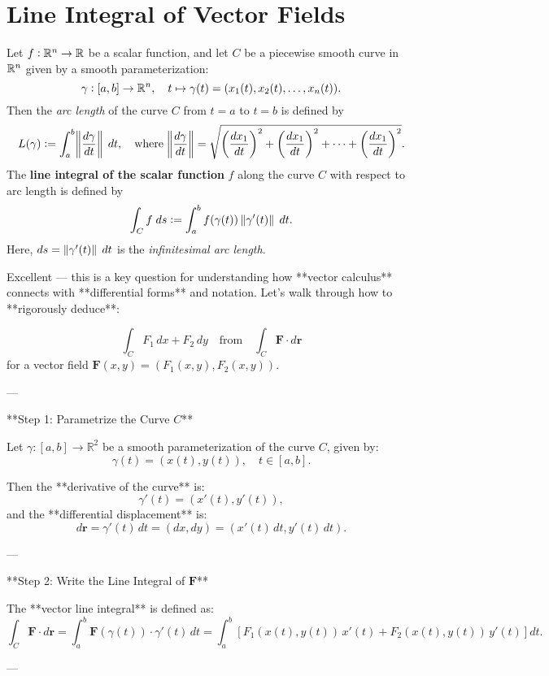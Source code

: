 \documentclass[11pt,openany]{article}
\renewcommand{\vec}[1]{\mathbf{#1}}
\begin{document}
\newpage
\section*{Line Integral of Vector Fields}
\begin{definition*}
	Let $f:\mathbb{R}^n\to\mathbb{R}$ be a scalar function, and let $C$ be a piecewise smooth curve in 
	$\mathbb{R}^n$ given by a smooth parameterization: \[
	\gamma:[a,b]\to\mathbb{R}^n,\quad t\mapsto \gamma(t)=(x_1(t),x_2(t),\dots,x_n(t)).
	\] Then the \emph{arc length} of the curve $C$ from $t=a$ to $t=b$ is defined by \[
	L(\gamma):=\int_a^b\norm{\frac{ d\gamma}{dt}}\; dt,\quad\text{where}\; \norm{\frac{d\gamma}{dt}}=\sqrt{\left(\frac{dx_1}{dt}\right)^2+\left(\frac{dx_1}{dt}\right)^2+\cdots + \left(\frac{dx_1}{dt}\right)^2}.
	\]The \textbf{line integral of the scalar function} $f$ along the curve $C$ with respect to arc length is defined by \[
	\int_C f\; ds :=\int_a^bf(\gamma(t))\norm[0]{\gamma'(t)}\; dt.
	\] Here, $ds=\norm[0]{\gamma'(t)}\; dt$ is the \emph{infinitesimal arc length}.
\end{definition*}


Excellent — this is a key question for understanding how **vector calculus** connects with **differential forms** and notation. Let's walk through how to **rigorously deduce**:

\[
\int_C F_1\,dx + F_2\,dy
\quad \text{from} \quad
\int_C \vec{F} \cdot d\vec{r}
\]
for a vector field \( \vec{F}(x,y) = (F_1(x,y), F_2(x,y)) \).

---



 **Step 1: Parametrize the Curve \( C \)**

Let \( \gamma: [a, b] \to \mathbb{R}^2 \) be a smooth parameterization of the curve \( C \), given by:
\[
\gamma(t) = (x(t), y(t)), \quad t \in [a, b].
\]

Then the **derivative of the curve** is:
\[
\gamma'(t) = (x'(t), y'(t)),
\]
and the **differential displacement** is:
\[
d\vec{r} = \gamma'(t)\,dt = (dx, dy) = (x'(t)\,dt, y'(t)\,dt).
\]

---

 **Step 2: Write the Line Integral of \( \vec{F} \)**

The **vector line integral** is defined as:
\[
\int_C \vec{F} \cdot d\vec{r}
= \int_a^b \vec{F}(\gamma(t)) \cdot \gamma'(t)\,dt
= \int_a^b \left[ F_1(x(t), y(t))\,x'(t) + F_2(x(t), y(t))\,y'(t) \right] dt.
\]

---
\end{document}
